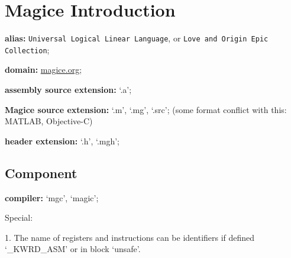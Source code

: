 \documentclass[UTF8]{book}
\begin{document}
	\author{dosconio}
	\section{Magice Introduction}
	
	\textbf{alias:} \texttt{Universal Logical Linear Language}, or
		\texttt{Love and Origin Epic Collection};
	
	\textbf{domain:} \href{http://magice.org}{magice.org};
	
	\textbf{assembly source extension:} `.a';

	\textbf{Magice source extension:} `.m', `.mg', `.src'; (some format conflict with this: MATLAB, Objective-C)
	
	\textbf{header extension:} `.h', `.mgh';
	
		\subsection{Component}
		
		\textbf{compiler:} `mgc', `magic';

	Special:

	1. The name of registers and instructions can be identifiers if defined `_KWRD_ASM' or in block `unsafe'.
\end{document}
